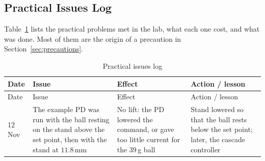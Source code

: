 \documentclass[11pt,a4paper]{article}
\begin{document}
\subsection{Practical Issues Log}
\label{sec:issues}
Table~\ref{tab:issues} lists the practical problems met in the lab, what each one cost, and what was done. Most of them are
the origin of a precaution in Section~\ref{sec:precautions}.

{\small
\begin{longtable}{@{}l>{\raggedright\arraybackslash}p{4.3cm}>{\raggedright\arraybackslash}p{4.2cm}>{\raggedright\arraybackslash}p{4.3cm}@{}}
\caption{Practical issues log}\label{tab:issues}\\
\toprule
Date & Issue & Effect & Action / lesson \\
\midrule
\endfirsthead
\toprule
Date & Issue & Effect & Action / lesson \\
\midrule
\endhead
12 Nov & The example PD was run with the ball resting on the stand above the set point, then with the stand at $11.8$\,mm &
No lift: the PD lowered the command, or gave too little current for the 39\,g ball & Stand lowered so that the ball rests below
the set point; later, the cascade controller \\


\end{longtable}}
\end{document}
